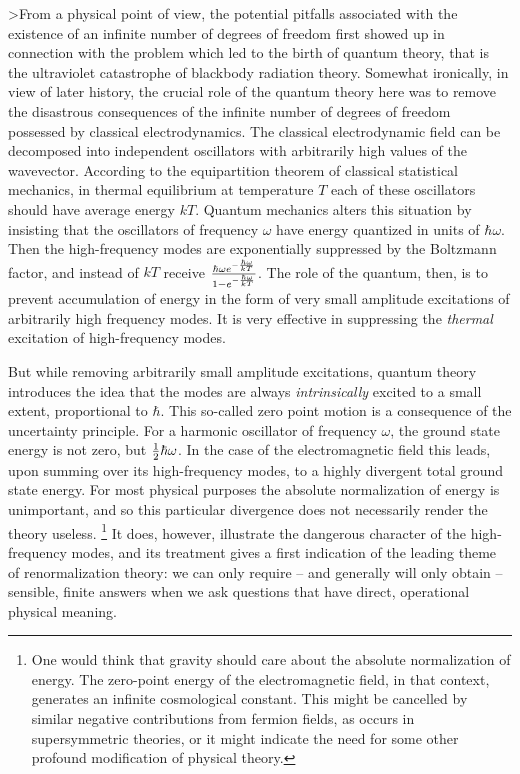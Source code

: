 \documentclass[12pt]{article}
\begin{document}
>From a physical point of view, the potential pitfalls associated with
the existence of an infinite number of degrees of freedom first showed
up in connection with the problem which led to the birth of quantum
theory, that is the ultraviolet catastrophe of blackbody radiation
theory.  Somewhat ironically, in view of later history, the crucial
role of the quantum theory here was to remove the disastrous
consequences of the infinite number of degrees of freedom possessed by
classical electrodynamics.  The classical electrodynamic field can be
decomposed into independent oscillators with arbitrarily high values
of the wavevector.  According to the equipartition theorem of
classical statistical mechanics, in thermal equilibrium at temperature
$T$ each of these oscillators should have average energy $kT$.
Quantum mechanics alters this situation by insisting that the
oscillators of frequency $\omega$ have energy quantized in units of
$\hbar \omega$.  Then the high-frequency modes are exponentially
suppressed by the Boltzmann factor, and instead of $kT$ receive
${\hbar \omega e^{-{\hbar \omega\over kT}} \over 1- e^{-{\hbar
\omega\over kT}}}$.  The role of the quantum, then, is to prevent
accumulation of energy in the form of very small amplitude excitations
of arbitrarily high frequency modes.  It is very effective in
suppressing the {\it thermal\/} excitation of high-frequency modes.

But while removing arbitrarily small amplitude
excitations, quantum theory introduces the idea that the modes are
always {\it intrinsically\/} excited to a small extent, proportional
to $\hbar$.  This so-called zero point motion is a consequence of the
uncertainty principle.  For a harmonic oscillator of frequency
$\omega$, the ground state energy is not zero, but ${1\over 2} \hbar
\omega$.  In the case of the electromagnetic field this leads, upon
summing over its high-frequency modes, to a highly divergent total
ground state energy.  For most physical purposes the absolute
normalization of energy is unimportant, and so this particular
divergence does not necessarily render the theory useless.  \footnote{One
would think that gravity should care about the absolute normalization
of energy.  The zero-point energy of the electromagnetic field, in
that context, generates an infinite cosmological constant.  This might
be cancelled by similar negative contributions from fermion fields, as
occurs in supersymmetric theories, or it might indicate the need for
some other profound modification of physical theory.}  It does,
however, illustrate the dangerous character of the high-frequency
modes, and its treatment gives a first indication of the leading theme
of renormalization theory: we can only require -- and generally will
only obtain -- sensible, finite answers when we ask questions that
have direct, operational physical meaning.  
\end{document}

